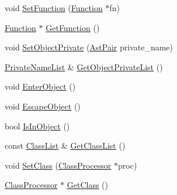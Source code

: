 \begin{DoxyCompactItemize}
void \hyperlink{classmocha_1_1_visitor_info_a2f0b5014798cc4b3c28f5446e1a82fb5}{SetFunction} (\hyperlink{classmocha_1_1_function}{Function} $\ast$fn)
\item 
\hyperlink{classmocha_1_1_function}{Function} $\ast$ \hyperlink{classmocha_1_1_visitor_info_a4512eccf2f755a6875f3088398ab3408}{GetFunction} ()
\item 
void \hyperlink{classmocha_1_1_visitor_info_a081f0c11a7163e9c8003804f61f793c2}{SetObjectPrivate} (\hyperlink{classmocha_1_1_visitor_info_aca4b022d8c40ae27463f274064950f7e}{AstPair} private\_\-name)
\item 
\hyperlink{classmocha_1_1_visitor_info_a04e4999e36bdea0dd35e1b260181bfda}{PrivateNameList} \& \hyperlink{classmocha_1_1_visitor_info_a68c7a28c73c1a5c1099d9f1c90050f78}{GetObjectPrivateList} ()
\item 
void \hyperlink{classmocha_1_1_visitor_info_a03342bd5b6b98d30a623e12b0acb9ff1}{EnterObject} ()
\item 
void \hyperlink{classmocha_1_1_visitor_info_aaac8f7d78da556be8aa1762170564088}{EscapeObject} ()
\item 
bool \hyperlink{classmocha_1_1_visitor_info_a60bc563472485a4482ce3ca84b05a9f3}{IsInObject} ()
\item 
const \hyperlink{namespacemocha_a01ec919b1dd7cd6a9d355222341db47a}{ClassList} \& \hyperlink{classmocha_1_1_visitor_info_a57bdbccd6437959bfdb1d2fe96005bec}{GetClassList} ()
\item 
void \hyperlink{classmocha_1_1_visitor_info_a09a24bc22bc2184d228aff36175e57c2}{SetClass} (\hyperlink{classmocha_1_1_class_processor}{ClassProcessor} $\ast$proc)
\item 
\hyperlink{classmocha_1_1_class_processor}{ClassProcessor} $\ast$ \hyperlink{classmocha_1_1_visitor_info_a622967fd7628426a0924a9ee417e181e}{GetClass} ()
\end{DoxyCompactItemize}
